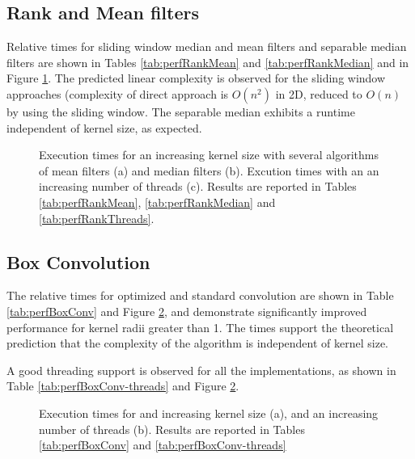 \documentclass[a4paper]{InsightArticle}
\begin{document}
\subsection{Rank and Mean filters}
Relative times for sliding window median and mean filters and
separable median filters are shown in Tables \ref{tab:perfRankMean}
and \ref{tab:perfRankMedian} and in Figure \ref{fig:perfRank}. The
predicted linear complexity is observed for the sliding window
approaches (complexity of direct approach is $O(n^2)$ in 2D, reduced
to $O(n)$ by using the sliding window. The separable median exhibits a
runtime independent of kernel size, as expected.

\begin{figure}[htbp]
\begin{center}
\caption{Execution times for an increasing kernel size with several algorithms of mean filters (a) and
median filters (b). Excution times with an an increasing number of threads (c).\label{fig:perfRank}
Results are reported in Tables \ref{tab:perfRankMean}, \ref{tab:perfRankMedian}
and \ref{tab:perfRankThreads}.}
\end{center}
\end{figure}


\subsection{Box Convolution}
The relative times for optimized and standard convolution are shown in
Table \ref{tab:perfBoxConv} and Figure \ref{fig:perfBoxConv}, and demonstrate significantly improved
performance for kernel radii greater than 1. The times support the
theoretical prediction that the complexity of the algorithm is
independent of kernel size.

A good threading support is observed for all the implementations, as shown in Table
\ref{tab:perfBoxConv-threads} and Figure \ref{fig:perfBoxConv}.


\begin{figure}[htbp]
\begin{center}
\caption{Execution times for and increasing kernel size (a), and an increasing number of threads (b).
\label{fig:perfBoxConv}
Results are reported in Tables \ref{tab:perfBoxConv} and  \ref{tab:perfBoxConv-threads}}
\end{center}
\end{figure}
\end{document}
